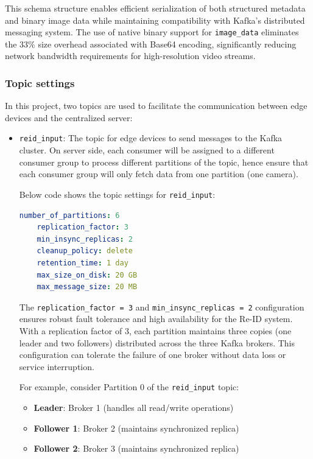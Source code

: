 This schema structure enables efficient serialization of both structured metadata and binary image data while maintaining compatibility with Kafka's distributed messaging system. The use of native binary support for \texttt{image\_data} eliminates the 33\% size overhead associated with Base64 encoding, significantly reducing network bandwidth requirements for high-resolution video streams.

\subsubsection{Topic settings}

In this project, two topics are used to facilitate the communication between edge devices and the centralized server:

\begin{itemize}
    \item \texttt{reid\_input}: The topic for edge devices to send messages to the Kafka cluster. On server side, each consumer will be assigned to a different consumer group to process different partitions of the topic, hence ensure that each consumer group will only fetch data from one  partition (one camera). 
    
    Below code shows the topic settings for \texttt{reid\_input}:
    
    \begin{lstlisting}[language=yaml]
    number_of_partitions: 6
    replication_factor: 3
    min_insync_replicas: 2
    cleanup_policy: delete
    retention_time: 1 day
    max_size_on_disk: 20 GB
    max_message_size: 20 MB
    \end{lstlisting}

    The \texttt{replication\_factor = 3} and \texttt{min\_insync\_replicas = 2} configuration ensures robust fault tolerance and high availability for the Re-ID system. With a replication factor of 3, each partition maintains three copies (one leader and two followers) distributed across the three Kafka brokers. This configuration can tolerate the failure of one broker without data loss or service interruption.
    
    For example, consider Partition 0 of the \texttt{reid\_input} topic:
    \begin{itemize}
        \item \textbf{Leader}: Broker 1 (handles all read/write operations)
        \item \textbf{Follower 1}: Broker 2 (maintains synchronized replica)
        \item \textbf{Follower 2}: Broker 3 (maintains synchronized replica)
    \end{itemize}
    

\end{itemize}
